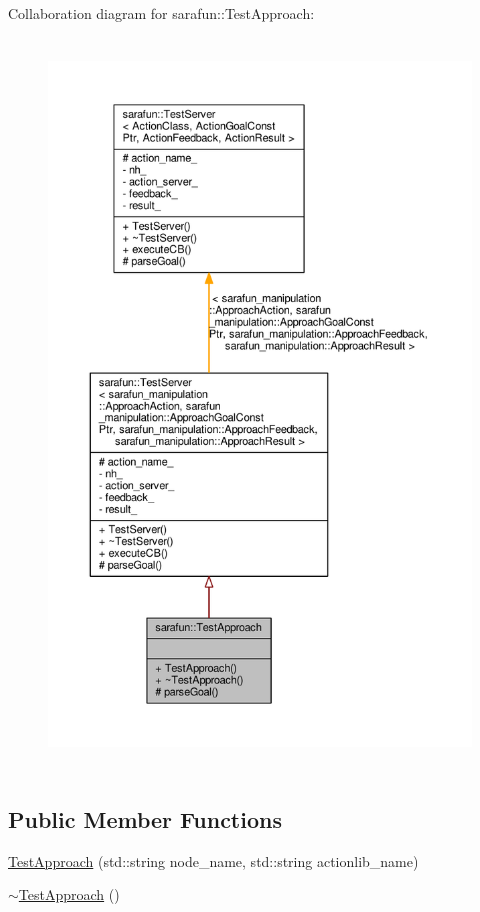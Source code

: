 Collaboration diagram for sarafun\-:\-:Test\-Approach\-:\nopagebreak
\begin{figure}[H]
\begin{center}
\leavevmode
\includegraphics[height=550pt]{d1/d01/classsarafun_1_1TestApproach__coll__graph}
\end{center}
\end{figure}
\subsection*{Public Member Functions}
\begin{DoxyCompactItemize}
\item 
\hyperlink{classsarafun_1_1TestApproach_aebd82243594c941ecceb4f73b44d4139_aebd82243594c941ecceb4f73b44d4139}{Test\-Approach} (std\-::string node\-\_\-name, std\-::string actionlib\-\_\-name)
\item 
\hyperlink{classsarafun_1_1TestApproach_a5a261f65818ad6ee669b75573811c31f_a5a261f65818ad6ee669b75573811c31f}{$\sim$\-Test\-Approach} ()
\end{DoxyCompactItemize}
